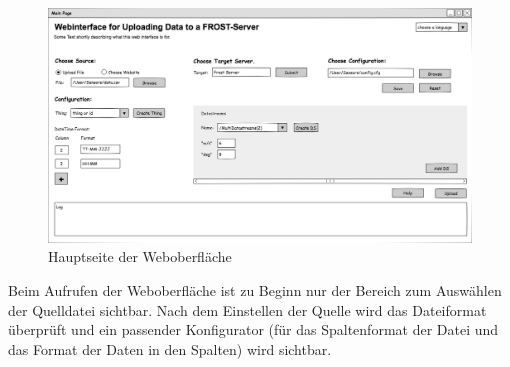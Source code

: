 \documentclass[a4paper, 12 pt]{article}
\begin{document}
\begin{figure}[htbp]
\centering
\includegraphics[scale=0.4]{images/gui}
\caption{\label{fig:guiMain}Hauptseite der Weboberfläche}
\end{figure}
Beim Aufrufen der Weboberfläche ist zu Beginn nur der Bereich zum Auswählen der Quelldatei sichtbar. 
Nach dem Einstellen der Quelle wird das Dateiformat überprüft und ein passender Konfigurator (für das Spaltenformat der Datei und das Format der Daten in den Spalten) wird sichtbar. \\
\end{document}
